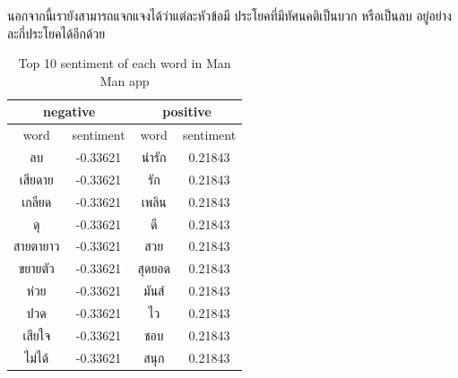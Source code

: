 นอกจากนี้เรายังสามารถแจกแจงได้ว่าแต่ละหัวข้อมี ประโยคที่มีทัศนคติเป็นบวก หรือเป็นลบ อยู่อย่างละกี่ประโยคได้อีกด้วย


\begin{table}[h]
	\renewcommand{\arraystretch}{1.3}
	\caption{Top 10 sentiment of each word in Man Man app}
	\label{table:Top10sentiword}
	\centering
	\begin{tabular}{|c|c|c|c|}
		\hline
		\multicolumn{2}{|c|}{negative} &
		\multicolumn{2}{|c|}{positive}\\
		\hline
		word & sentiment & word & sentiment\\
		\hline
		ลบ & -0.33621 & น่ารัก & 0.21843\\
		\hline
		เสียดาย & -0.33621 & รัก & 0.21843\\
		\hline
		เกลียด & -0.33621 & เพลิน & 0.21843\\
		\hline
		ดุ & -0.33621 & ดี & 0.21843\\
		\hline
		สายตายาว & -0.33621 & สวย & 0.21843\\
		\hline
		ขยายตัว & -0.33621 & สุดยอด & 0.21843\\
		\hline
		ห่วย & -0.33621 & มันส์ & 0.21843\\
		\hline
		ปวด & -0.33621 & ไว & 0.21843\\
		\hline
		เสียใจ & -0.33621 & ชอบ & 0.21843\\
		\hline
		ไม่ได้ & -0.33621 & สนุก & 0.21843\\
		\hline
	\end{tabular}
\end{table}

